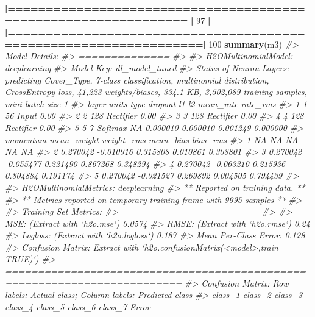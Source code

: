 \documentclass[]{book}
\newenvironment{Shaded}{\begin{snugshade}}{\end{snugshade}}
\newcommand{\CommentTok}[1]{\textcolor[rgb]{0.56,0.35,0.01}{\textit{#1}}}
\newcommand{\DecValTok}[1]{\textcolor[rgb]{0.00,0.00,0.81}{#1}}
\newcommand{\ErrorTok}[1]{\textcolor[rgb]{0.64,0.00,0.00}{\textbf{#1}}}
\newcommand{\KeywordTok}[1]{\textcolor[rgb]{0.13,0.29,0.53}{\textbf{#1}}}
\newcommand{\NormalTok}[1]{#1}
\newcommand{\OperatorTok}[1]{\textcolor[rgb]{0.81,0.36,0.00}{\textbf{#1}}}
\newcommand{\StringTok}[1]{\textcolor[rgb]{0.31,0.60,0.02}{#1}}
\begin{document}
\begin{Shaded}
\begin{Highlighting}[]
{{{{{{{{{{{{{{{{{{{{{{{{{{{{{{{{{{{\StringTok{  }\ErrorTok{|===============================================================}\StringTok{  }\ErrorTok{|}\StringTok{  }\DecValTok{97}\NormalTok{%}
  \OperatorTok{|}\StringTok{                                                                       }
\StringTok{  }\ErrorTok{|=================================================================|}\StringTok{ }\DecValTok{100}\NormalTok{%}
\KeywordTok{summary}\NormalTok{(m3)}
\CommentTok{#> Model Details:}
\CommentTok{#> ==============}
\CommentTok{#> }
\CommentTok{#> H2OMultinomialModel: deeplearning}
\CommentTok{#> Model Key:  dl_model_tuned }
\CommentTok{#> Status of Neuron Layers: predicting Cover_Type, 7-class classification, multinomial distribution, CrossEntropy loss, 41,223 weights/biases, 334.1 KB, 3,502,089 training samples, mini-batch size 1}
\CommentTok{#>   layer units      type dropout       l1       l2 mean_rate rate_rms}
\CommentTok{#> 1     1    56     Input  0.00 %       NA       NA        NA       NA}
\CommentTok{#> 2     2   128 Rectifier  0.00 % 0.000010 0.000010  0.001249 0.000000}
\CommentTok{#> 3     3   128 Rectifier  0.00 % 0.000010 0.000010  0.001249 0.000000}
\CommentTok{#> 4     4   128 Rectifier  0.00 % 0.000010 0.000010  0.001249 0.000000}
\CommentTok{#> 5     5     7   Softmax      NA 0.000010 0.000010  0.001249 0.000000}
\CommentTok{#>   momentum mean_weight weight_rms mean_bias bias_rms}
\CommentTok{#> 1       NA          NA         NA        NA       NA}
\CommentTok{#> 2 0.270042   -0.010916   0.315808  0.010861 0.308801}
\CommentTok{#> 3 0.270042   -0.055477   0.221490  0.867268 0.348294}
\CommentTok{#> 4 0.270042   -0.063210   0.215936  0.804884 0.191174}
\CommentTok{#> 5 0.270042   -0.021527   0.269892  0.004505 0.794439}
\CommentTok{#> }
\CommentTok{#> H2OMultinomialMetrics: deeplearning}
\CommentTok{#> ** Reported on training data. **}
\CommentTok{#> ** Metrics reported on temporary training frame with 9995 samples **}
\CommentTok{#> }
\CommentTok{#> Training Set Metrics: }
\CommentTok{#> =====================}
\CommentTok{#> }
\CommentTok{#> MSE: (Extract with `h2o.mse`) 0.0574}
\CommentTok{#> RMSE: (Extract with `h2o.rmse`) 0.24}
\CommentTok{#> Logloss: (Extract with `h2o.logloss`) 0.187}
\CommentTok{#> Mean Per-Class Error: 0.128}
\CommentTok{#> Confusion Matrix: Extract with `h2o.confusionMatrix(<model>,train = TRUE)`)}
\CommentTok{#> =========================================================================}
\CommentTok{#> Confusion Matrix: Row labels: Actual class; Column labels: Predicted class}
\CommentTok{#>         class_1 class_2 class_3 class_4 class_5 class_6 class_7  Error}
}}}}}}}}}}}}}}}}}}}}}}}}}}}}}}}}}}}}}}}}}
\end{Highlighting}
\end{Shaded}
\end{document}

